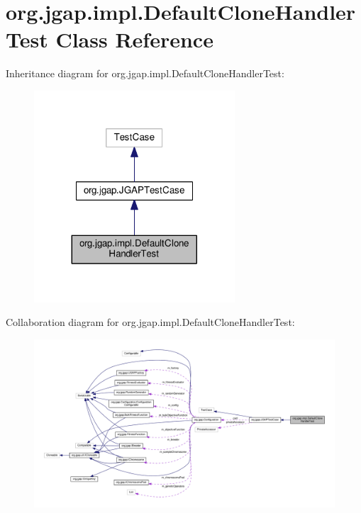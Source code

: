 \hypertarget{classorg_1_1jgap_1_1impl_1_1_default_clone_handler_test}{\section{org.\-jgap.\-impl.\-Default\-Clone\-Handler\-Test Class Reference}
\label{classorg_1_1jgap_1_1impl_1_1_default_clone_handler_test}
}


Inheritance diagram for org.\-jgap.\-impl.\-Default\-Clone\-Handler\-Test\-:
\nopagebreak
\begin{figure}[H]
\begin{center}
\leavevmode
\includegraphics[width=212pt]{classorg_1_1jgap_1_1impl_1_1_default_clone_handler_test__inherit__graph}
\end{center}
\end{figure}


Collaboration diagram for org.\-jgap.\-impl.\-Default\-Clone\-Handler\-Test\-:
\nopagebreak
\begin{figure}[H]
\begin{center}
\leavevmode
\includegraphics[width=350pt]{classorg_1_1jgap_1_1impl_1_1_default_clone_handler_test__coll__graph}
\end{center}
\end{figure}
